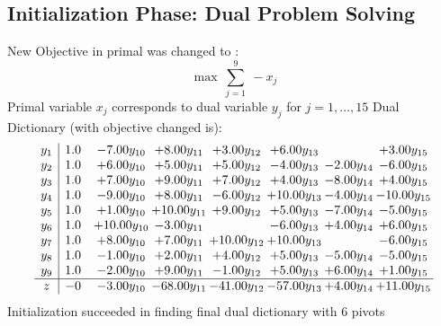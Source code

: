 \documentclass[9pt]{article}
\begin{document}
\subsection{Initialization Phase: Dual Problem Solving}
New Objective in primal was changed to : \[ \max\ \sum_{j=1}^{9}\ - x_j \] 
Primal variable $x_j$ corresponds to dual variable $y_j$ for $j = 1,\ldots,15$
Dual Dictionary (with objective changed is): 
\[\begin{array}{c| c c@{\hskip 2pt} c@{\hskip 2pt} c@{\hskip 2pt} c@{\hskip 2pt} c@{\hskip 2pt} c@{\hskip 2pt} }
 y_{1}   &  1.0 & -7.00 y_{10} & +  8.00 y_{11} & +  3.00 y_{12} & +  6.00 y_{13} &   & +  3.00 y_{15}\\
 y_{2}   &  1.0 & +  6.00 y_{10} & +  5.00 y_{11} & +  5.00 y_{12} & -4.00 y_{13} & -2.00 y_{14} & -6.00 y_{15}\\
 y_{3}   &  1.0 & +  7.00 y_{10} & +  9.00 y_{11} & +  7.00 y_{12} & +  4.00 y_{13} & -8.00 y_{14} & +  4.00 y_{15}\\
 y_{4}   &  1.0 & -9.00 y_{10} & +  8.00 y_{11} & -6.00 y_{12} & + 10.00 y_{13} & -4.00 y_{14} & -10.00 y_{15}\\
 y_{5}   &  1.0 & +  1.00 y_{10} & + 10.00 y_{11} & +  9.00 y_{12} & +  5.00 y_{13} & -7.00 y_{14} & -5.00 y_{15}\\
 y_{6}   &  1.0 & + 10.00 y_{10} & -3.00 y_{11} &   & -6.00 y_{13} & +  4.00 y_{14} & +  6.00 y_{15}\\
 y_{7}   &  1.0 & +  8.00 y_{10} & +  7.00 y_{11} & + 10.00 y_{12} & + 10.00 y_{13} &   & -6.00 y_{15}\\
 y_{8}   &  1.0 & -1.00 y_{10} & +  2.00 y_{11} & +  4.00 y_{12} & +  5.00 y_{13} & -5.00 y_{14} & -5.00 y_{15}\\
 y_{9}   &  1.0 & -2.00 y_{10} & +  9.00 y_{11} & -1.00 y_{12} & +  5.00 y_{13} & +  6.00 y_{14} & +  1.00 y_{15}\\
\hline
z    &  -0 & -3.00 y_{10} & -68.00 y_{11} & -41.00 y_{12} & -57.00 y_{13} & +  4.00 y_{14} & + 11.00 y_{15}\\
\end{array}\]
Initialization succeeded in finding final dual dictionary with 6 pivots
\end{document}
